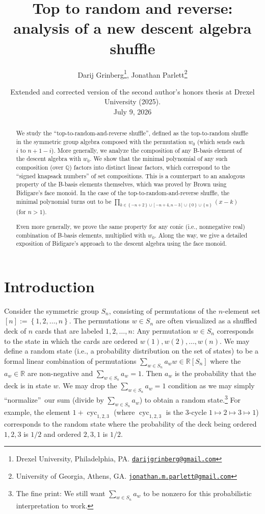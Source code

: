 \documentclass[12pt]{article}
\title{Top to random and reverse: analysis of a new descent algebra shuffle}
\author{Darij Grinberg\footnote{Drexel University, Philadelphia, PA. \href{mailto:darijgrinberg@gmail.com}{\texttt{darijgrinberg@gmail.com}}}, Jonathan Parlett\footnote{University of Georgia, Athens, GA. \href{mailto:jonathan.m.parlett@gmail.com}{\texttt{jonathan.m.parlett@gmail.com}}}}
\date{Extended and corrected version of the second author's honors thesis at Drexel University (2025). \medskip\\
July 9, 2026}
\theoremstyle{definition}%
\theoremstyle{definition}%
\theoremstyle{remark}%
\newcommand{\tup}[1]{\left( #1 \right)}
\newcommand{\interval}[1]{\left[ #1 \right]} %
\newcommand{\set}[1]{\left\{ #1 \right\}}
\newcommand{\cyc}[1]{\operatorname{cyc}_{#1}}
\begin{document}
\maketitle

\begin{abstract}
We study the ``top-to-random-and-reverse shuffle'', defined as the top-to-random shuffle in the symmetric group algebra composed with the permutation $w_0$ (which sends each $i$ to $n+1-i$). More generally, we analyze the composition of any B-basis element of the descent algebra with $w_0$. We show that the minimal polynomial of any such composition (over $\mathbb{Q}$) factors into distinct linear factors, which correspond to the ``signed knapsack numbers'' of set compositions. This is a counterpart to an analogous property of the B-basis elements themselves, which was proved by Brown using Bidigare's face monoid. In the case of the top-to-random-and-reverse shuffle, the minimal polynomial turns out to be $\prod_{k \in \set{-n+2} \cup \interval{-n+4, n-3} \cup \set{0} \cup \set{n}} \tup{x-k}$ (for $n>1$).

Even more generally, we prove the same property for any conic (i.e., nonnegative real) combination of B-basis elements, multiplied with $w_0$. Along the way, we give a detailed exposition of Bidigare's approach to the descent algebra using the face monoid.
\end{abstract}

\section{\label{sec.intro}Introduction}

Consider the symmetric group $S_n$, consisting of permutations of the $n$-element set $\interval{n} := \set{1, 2, \ldots, n}$.
The permutations $w \in S_n$ are often visualized as a shuffled deck of $n$ cards that are labeled $1,2,\dots,n$:
Any permutation $w \in S_n$ corresponds to the state in which the cards are ordered $w\tup{1},w\tup{2},\dots,w\tup{n}$.
We may define a random state (i.e., a probability distribution on the set of states) to be a formal linear combination of permutations $\sum_{w \in S_n} a_{w}w \in \mathbb{R}[S_n]$ where the $a_{w} \in \mathbb{R}$ are non-negative and $\sum_{w \in S_n} a_{w}=1$.
Then $a_{w}$ is the probability that the deck is in state $w$.
We may drop the $\sum_{w \in S_n} a_{w}=1$ condition as we may simply ``normalize''\ our sum (divide by $\sum_{w \in S_n }a_{w}$) to obtain a random state.\footnote{The fine print: We still want $\sum_{w \in S_n} a_w$ to be nonzero for this probabilistic interpretation to work.}
For example, the element $1 + \cyc{1,2,3}$ (where $\cyc{1,2,3}$ is the $3$-cycle $1 \mapsto 2 \mapsto 3 \mapsto 1$) corresponds to the random state where the probability of the deck being ordered $1,2,3$ is $1/2$ and ordered $2,3,1$ is $1/2$.
\end{document}
